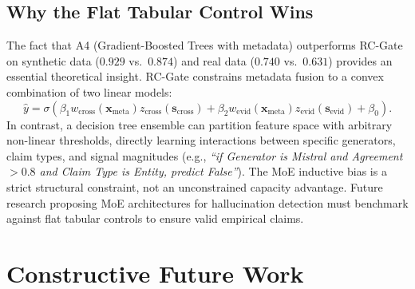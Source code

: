 \documentclass[pdflatex,sn-mathphys,Numbered]{sn-jnl}
\begin{document}
\subsection{Why the Flat Tabular Control Wins}\label{subsec:why_gbm_wins}

The fact that A4 (Gradient-Boosted Trees with metadata) outperforms RC-Gate on synthetic data ($0.929$ vs.\ $0.874$) and real data ($0.740$ vs.\ $0.631$) provides an essential theoretical insight. RC-Gate constrains metadata fusion to a convex combination of two linear models:
\begin{equation}
\hat{y} = \sigma\left(\beta_1 w_{\mathrm{cross}}(\mathbf{x}_{\mathrm{meta}}) z_{\mathrm{cross}}(\mathbf{s}_{\mathrm{cross}}) + \beta_2 w_{\mathrm{evid}}(\mathbf{x}_{\mathrm{meta}}) z_{\mathrm{evid}}(\mathbf{s}_{\mathrm{evid}}) + \beta_0\right).
\end{equation}
In contrast, a decision tree ensemble can partition feature space with arbitrary non-linear thresholds, directly learning interactions between specific generators, claim types, and signal magnitudes (e.g., \emph{``if Generator is Mistral and Agreement $> 0.8$ and Claim Type is Entity, predict False''}). The MoE inductive bias is a strict structural constraint, not an unconstrained capacity advantage. Future research proposing MoE architectures for hallucination detection must benchmark against flat tabular controls to ensure valid empirical claims.

\section{Constructive Future Work}\label{sec:future_work}
\end{document}
